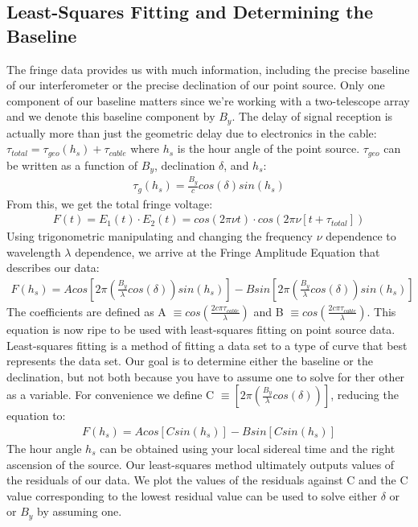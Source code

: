 \documentclass{article}
\begin{document}
\subsection{Least-Squares Fitting and Determining the Baseline}
The fringe data provides us with much information, including the precise
baseline of our interferometer or the precise declination of our point
source. Only one component of our baseline matters since we're working
with a two-telescope array and we denote this baseline component by
$B_{y}$. The delay of signal reception is actually more than just the
geometric delay due to electronics in the cable: $\tau_{total} =
\tau_{geo}(h_{s}) + \tau_{cable}$ where $h_{s}$ is the hour angle of the
point source. $\tau_{geo}$ can be written as a function of $B_{y}$,
declination $\delta$, and $h_{s}$:
\begin{align}\tau_{g}(h_{s}) = \frac{B_{y}}{c}cos(\delta)sin(h_{s})
\end{align}
From this, we get the total fringe voltage:
\begin{align}F(t) = E_{1}(t)\cdot E_{2}(t) = cos(2\pi\nu{t})\cdot
  cos(2\pi\nu[t+\tau_{total}])
\end{align}
Using trigonometric manipulating and changing the frequency $\nu$
dependence to wavelength $\lambda$ dependence, we arrive at the Fringe
Amplitude Equation that describes our data:
\begin{align}F(h_{s}) =
  Acos[2\pi(\frac{B_{y}}{\lambda}cos(\delta))sin(h_{s})] -
  Bsin[2\pi(\frac{B_{y}}{\lambda}cos(\delta))sin(h_{s})] 
\end{align}  
The coefficients are defined as A $\equiv
cos(\frac{2c\pi\tau_{cable}}{\lambda})$ and B $\equiv 
cos(\frac{2c\pi\tau_{cable}}{\lambda})$. This equation is now ripe to be
used with least-squares fitting on point source data. Least-squares
fitting is a method of fitting a data set to a type of curve that best
represents the data set. Our goal is to determine either the baseline or
the declination, but not both because you have to assume one to solve
for ther other as a variable. For convenience we define C $\equiv
[2\pi(\frac{B_{y}}{\lambda}cos(\delta))]$, reducing the equation to:
\begin{align}F(h_{s}) = Acos[Csin(h_{s})] - Bsin[Csin(h_{s})] 
\end{align} 
The hour angle $h_{s}$ can be obtained using your local sidereal time
and the right ascension of the source. Our least-squares method
ultimately outputs values of the residuals of our data. We plot the
values of the residuals against C and the C value corresponding to the
lowest residual value can be used to solve either $\delta$ or or $B_{y}$
by assuming one.  
\end{document}

